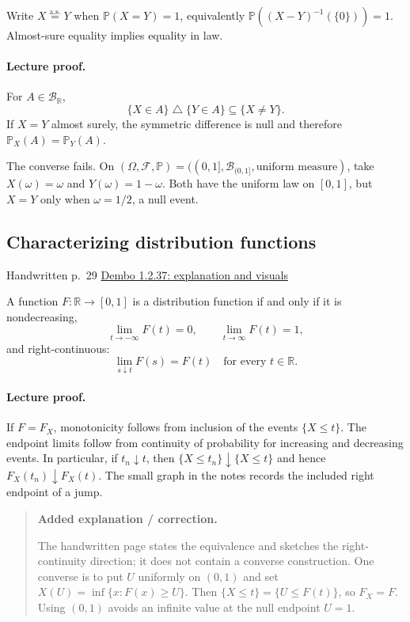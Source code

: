 \documentclass[11pt,letterpaper]{article}
\newcommand{\lecturesection}[1]{\subsection{#1}}
\begin{document}
Write $X\overset{\mathrm{a.s.}}=Y$ when $\mathbb P(X=Y)=1$, equivalently $\mathbb P((X-Y)^{-1}(\{0\}))=1$. Almost-sure equality implies equality in law.

\paragraph{Lecture proof.}
For $A\in\mathcal B_{\mathbb R}$, \[\{X\in A\}\mathbin{\triangle}\{Y\in A\}\subseteq\{X\ne Y\}.\] If $X=Y$ almost surely, the symmetric difference is null and therefore $\mathbb P_X(A)=\mathbb P_Y(A)$.

The converse fails. On $(\Omega,\mathcal F,\mathbb P)=((0,1],\mathcal B_{(0,1]},\text{uniform measure})$, take $X(\omega)=\omega$ and $Y(\omega)=1-\omega$. Both have the uniform law on $[0,1]$, but $X=Y$ only when $\omega=1/2$, a null event.

\hypertarget{l4-s3}{}
\lecturesection{Characterizing distribution functions}
{\small\textcolor{lectureink}{Handwritten p.\ 29} \quad \href{https://josephrbailey.com/probability/\#entry-1-2-37}{Dembo 1.2.37: explanation and visuals}}

A function $F:\mathbb R\to[0,1]$ is a distribution function if and only if it is nondecreasing, \[\lim_{t\to-\infty}F(t)=0,\qquad \lim_{t\to\infty}F(t)=1,\] and right-continuous: \[\lim_{s\downarrow t}F(s)=F(t)\quad\text{for every }t\in\mathbb R.\]

\paragraph{Lecture proof.}
If $F=F_X$, monotonicity follows from inclusion of the events $\{X\le t\}$. The endpoint limits follow from continuity of probability for increasing and decreasing events. In particular, if $t_n\downarrow t$, then $\{X\le t_n\}\downarrow\{X\le t\}$ and hence $F_X(t_n)\downarrow F_X(t)$. The small graph in the notes records the included right endpoint of a jump.

\begin{quote}\small\textbf{Added explanation / correction.}

The handwritten page states the equivalence and sketches the right-continuity direction; it does not contain a converse construction. One converse is to put $U$ uniformly on $(0,1)$ and set $X(U)=\inf\{x:F(x)\ge U\}$. Then $\{X\le t\}=\{U\le F(t)\}$, so $F_X=F$. Using $(0,1)$ avoids an infinite value at the null endpoint $U=1$.
\end{quote}
\end{document}
